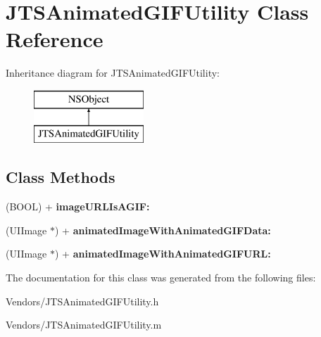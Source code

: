 \hypertarget{interface_j_t_s_animated_g_i_f_utility}{}\section{J\+T\+S\+Animated\+G\+I\+F\+Utility Class Reference}
\label{interface_j_t_s_animated_g_i_f_utility}
Inheritance diagram for J\+T\+S\+Animated\+G\+I\+F\+Utility\+:\begin{figure}[H]
\begin{center}
\leavevmode
\includegraphics[height=2.000000cm]{interface_j_t_s_animated_g_i_f_utility}
\end{center}
\end{figure}
\subsection*{Class Methods}
\begin{DoxyCompactItemize}
\item 
\hypertarget{interface_j_t_s_animated_g_i_f_utility_ae8625b410b9ba3c13824c559d499ce0b}{}(B\+O\+O\+L) + {\bfseries image\+U\+R\+L\+Is\+A\+G\+I\+F\+:}\label{interface_j_t_s_animated_g_i_f_utility_ae8625b410b9ba3c13824c559d499ce0b}

\item 
\hypertarget{interface_j_t_s_animated_g_i_f_utility_a9a6ef02a4659697fdc302b2c7d466789}{}(U\+I\+Image $\ast$) + {\bfseries animated\+Image\+With\+Animated\+G\+I\+F\+Data\+:}\label{interface_j_t_s_animated_g_i_f_utility_a9a6ef02a4659697fdc302b2c7d466789}

\item 
\hypertarget{interface_j_t_s_animated_g_i_f_utility_ad883e4cce1ac88a397da3ddce89d831f}{}(U\+I\+Image $\ast$) + {\bfseries animated\+Image\+With\+Animated\+G\+I\+F\+U\+R\+L\+:}\label{interface_j_t_s_animated_g_i_f_utility_ad883e4cce1ac88a397da3ddce89d831f}

\end{DoxyCompactItemize}


The documentation for this class was generated from the following files\+:\begin{DoxyCompactItemize}
\item 
Vendors/J\+T\+S\+Animated\+G\+I\+F\+Utility.\+h\item 
Vendors/J\+T\+S\+Animated\+G\+I\+F\+Utility.\+m\end{DoxyCompactItemize}
